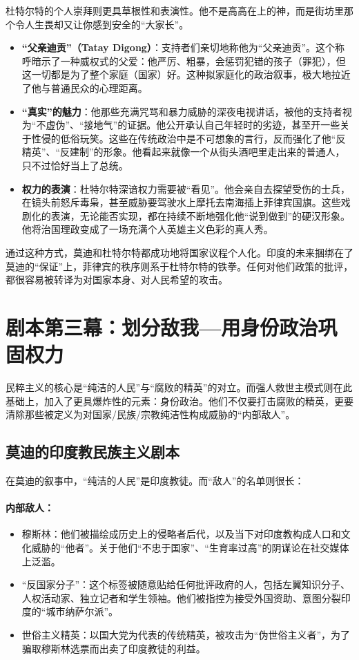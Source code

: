 杜特尔特的个人崇拜则更具草根性和表演性。他不是高高在上的神，而是街坊里那个令人生畏却又让你感到安全的``大家长''。
\begin{itemize}
\item \textbf{``父亲迪贡''（Tatay Digong）}：支持者们亲切地称他为``父亲迪贡''。这个称呼暗示了一种威权式的父爱：他严厉、粗暴，会惩罚犯错的孩子（罪犯），但这一切都是为了整个家庭（国家）好。这种拟家庭化的政治叙事，极大地拉近了他与普通民众的心理距离。
\item \textbf{``真实''的魅力}：他那些充满咒骂和暴力威胁的深夜电视讲话，被他的支持者视为``不虚伪''、``接地气''的证据。他公开承认自己年轻时的劣迹，甚至开一些关于性侵的低俗玩笑。这些在传统政治中是不可想象的言行，反而强化了他``反精英''、``反建制''的形象。他看起来就像一个从街头酒吧里走出来的普通人，只不过恰好当上了总统。
\item \textbf{权力的表演}：杜特尔特深谙权力需要被``看见''。他会亲自去探望受伤的士兵，在镜头前怒斥毒枭，甚至威胁要驾驶水上摩托去南海插上菲律宾国旗。这些戏剧化的表演，无论能否实现，都在持续不断地强化他``说到做到''的硬汉形象。他将治国理政变成了一场充满个人英雄主义色彩的真人秀。
\end{itemize}
通过这种方式，莫迪和杜特尔特都成功地将国家议程个人化。印度的未来捆绑在了莫迪的``保证''上，菲律宾的秩序则系于杜特尔特的铁拳。任何对他们政策的批评，都很容易被转译为对国家本身、对人民希望的攻击。

\section{剧本第三幕：划分敌我---用身份政治巩固权力}
民粹主义的核心是``纯洁的人民''与``腐败的精英''的对立。而强人救世主模式则在此基础上，加入了更具爆炸性的元素：身份政治。他们不仅要打击腐败的精英，更要清除那些被定义为对国家/民族/宗教纯洁性构成威胁的``内部敌人''。

\subsection{莫迪的印度教民族主义剧本}

在莫迪的叙事中，``纯洁的人民''是印度教徒。而``敌人''的名单则很长：

\paragraph*{内部敌人：}
\begin{itemize}
\item 穆斯林：他们被描绘成历史上的侵略者后代，以及当下对印度教构成人口和文化威胁的``他者''。关于他们``不忠于国家''、``生育率过高''的阴谋论在社交媒体上泛滥。
\item ``反国家分子''：这个标签被随意贴给任何批评政府的人，包括左翼知识分子、人权活动家、独立记者和学生领袖。他们被指控为接受外国资助、意图分裂印度的``城市纳萨尔派''。
\item 世俗主义精英：以国大党为代表的传统精英，被攻击为``伪世俗主义者''，为了骗取穆斯林选票而出卖了印度教徒的利益。
\end{itemize}

